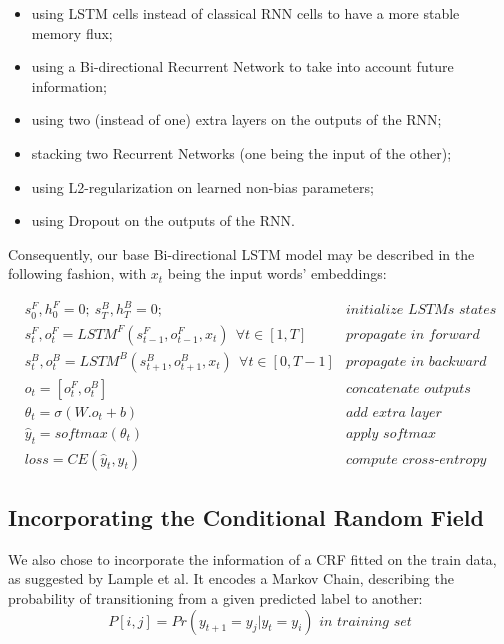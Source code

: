 \documentclass{article} %
\begin{document}
\begin{itemize}
\itemsep1pt\parskip0pt
\item
  using LSTM cells instead of classical RNN cells to have a more stable
  memory flux;
\item
  using a Bi-directional Recurrent Network to take into account future
  information;
\item
  using two (instead of one) extra layers on the outputs of the RNN;
\item
  stacking two Recurrent Networks (one being the input of the other);
\item
  using L2-regularization on learned non-bias parameters;
\item
  using Dropout on the outputs of the RNN.
\end{itemize}

Consequently, our base Bi-directional LSTM model may be described in the
following fashion, with $x_t$ being the input words' embeddings:

\begin{align*}
&s^F_0, h^F_0 = 0;\ s^B_T, h^B_T = 0; &\textit{initialize LSTMs states}
\\
&s^F_t, o^F_t = LSTM^F(s^F_{t-1}, o^F_{t-1}, x_t) \ \ \forall t \in [1, T] &\textit{propagate in forward LSTM}
\\
&s^B_t, o^B_t = LSTM^B(s^B_{t+1}, o^B_{t+1}, x_t) \ \ \forall t \in [0, T-1] &\textit{propagate in backward LSTM}
\\
& o_t = [o^F_t, o^B_t] & \textit{concatenate outputs}
\\
& \theta_t = \sigma(W.o_t + b) & \textit{add extra layer}
\\
& \hat{y}_t =softmax(\theta_t) & \textit{apply softmax}
\\
& loss = CE(\hat{y}_t, y_t) & \textit{compute cross-entropy}
\end{align*}


\subsection{Incorporating the Conditional Random Field}

We also chose to incorporate the information of a CRF fitted on the
train data, as suggested by Lample et al\cite{lample2016neural}. It encodes a Markov Chain, describing the probability of transitioning from a given predicted label to another: \[
P[i, j] = Pr(y_{t+1} = y_j | y_{t} =y_i) \textit{ in training set}
\]
\end{document}
